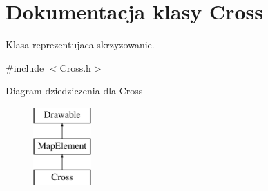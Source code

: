 \hypertarget{class_cross}{\section{Dokumentacja klasy Cross}
\label{class_cross}
}


Klasa reprezentujaca skrzyzowanie.  




{\ttfamily \#include $<$Cross.\-h$>$}

Diagram dziedziczenia dla Cross\begin{figure}[H]
\begin{center}
\leavevmode
\includegraphics[height=3.000000cm]{class_cross}
\end{center}
\end{figure}
